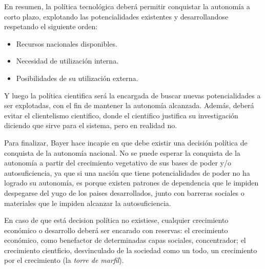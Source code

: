 En resumen, la política tecnológica deberá permitir conquistar la autonomía a corto
plazo, explotando las potencialidades existentes y desarrollandose respetando el siguiente orden:
\begin{itemize}
    \item Recursos nacionales disponibles.
    \item Necesidad de utilización interna.
    \item Posibilidades de su utilización externa.
\end{itemize}

Y luego la política cientifica será la encargada de buscar nuevas potencialidades a ser explotadas, con el fin de mantener la autonomía alcanzada. Además, deberá evitar el clientelismo cientifico, donde el cientifico justifica su investigación diciendo que sirve para el sistema, pero en realidad no.

\vspace{0.5em}

Para finalizar, Bayer hace incapie en que debe existir una decisión política de conquista de la autonomía nacional. No se puede esperar la conquista de la autonomía a partir del crecimiento vegetativo de sus bases de poder y/o autosuficiencia, ya que si una nación que tiene potencialidades de poder no ha logrado su autonomía, es porque existen patrones de dependencia que le impiden despegarse del yugo de los paises desarrollados, junto con barreras sociales o materiales que le impiden alcanzar la autosuficiencia.

En caso de que está decision política no existiese, cualquier crecimiento económico o desarrollo deberá ser encarado con reservas: el crecimiento económico, como benefactor de determinadas capas sociales, concentrador; el crecimiento cientficio, desvinculado de la sociedad como un todo, un crecimiento por el crecimiento (la \textit{torre de marfil}).
